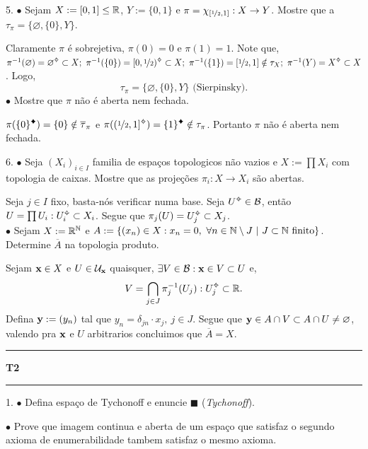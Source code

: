 5. \(\bullet \) Sejam \(X := [0,1]\leq \mathbb{R} \), \(Y := \{0,1\}\) e \(\pi = \chi_{[\nicefrac{1}{2}, 1]} : X \to Y\). Mostre que a \(\tau_\pi = \{\varnothing, \{0\}, Y \}\). 

\textcolor{gris}{Claramente \(\pi\) é sobrejetiva, \(\pi(0) = 0\) e \(\pi(1)=1\). Note que, \(\pi^{-1}(\varnothing) = \varnothing\ab \subset X; \ \pi^{-1}(\{0\}) = [0,\nicefrac{1}{2})\ab \subset X; \ \pi^{-1}(\{1\}) = [\nicefrac{1}{2}, 1]\notin \tau_X; \ \pi^{-1}(Y) = X\ab \subset X  \). Logo, 
\[\tau_\pi = \{\varnothing, \{0\}, Y\} \text{ (Sierpinsky)}.\]
} 
\(\bullet \) Mostre que \(\pi\) não é aberta nem fechada.   

\textcolor{gris}{\(\pi(\{0\}\ce) = \{0\} \notin \overline{\tau}_\pi\) e \(\pi((\nicefrac{1}{2}, 1]\ab) = \{1\}\ce\notin \tau_\pi\). Portanto \(\pi\) não é aberta nem fechada.} 

6. \(\bullet \) Seja \((X_i)_{i\in I }\) familia de espaços topologicos não vazios e \(X := \prod X_i\) com topologia de caixas. Mostre que as projeções \(\pi_i: X \to X_i\) são abertas.   

\textcolor{gris}{Seja \(j\in I \) fixo, basta-nós verificar numa base. Seja \( U\ab \in \mathcal{B}\), então \(U= \prod U_i : U_i\ab \subset X_i\). Segue que \(\pi_j(U) = U_j\ab \subset X_j\).  }\vspace{-0.2cm}\\ 
\(\bullet \) Sejam \(X:= \mathbb{R}^{\mathbb{N}}\) e \(A:= \{(x_n) \in X : x_n = 0, \ \forall n \in \mathbb{N}\setminus J \ |\  J\subset \mathbb{N} \text{ finito}\}\). Determine \(\overline{A}\) na topologia produto. 

\textcolor{gris}{Sejam \(\textbf{x} \in X\) e \(U \in \mathcal{U}_{\textbf{x}}\) quaisquer, \(\exists V \in \mathcal{B}: \textbf{x} \in V \subset U\)  e, 
\[V = \bigcap_{j\in J} \pi^{-1}_j(U_j): U_j\ab \subset \R. \]
Defina \(\textbf{y} := (y_n) \) tal que \(y_n = \delta_{jn}\cdot x_j, \ j\in J\). Segue que \(\textbf{y} \in A \cap V\subset A\cap U\neq \varnothing\), valendo pra \(\textbf{x}\) e \( U\) arbitrarios concluimos que \(\overline{A} = X \). 
} 
\- \vspace{0.5cm}
  {\hrule \vspace{-0.15cm}
  \centering \textbf{T2} \vspace{0.1cm}
  \hrule}

1. \(\bullet\) Defina espaço de Tychonoff e enuncie \(\blacksquare\) (\emph{Tychonoff}).   

\(\bullet\) Prove que imagem continua e aberta de um espaço que satisfaz o segundo axioma de enumerabilidade tambem satisfaz o mesmo axioma.   

